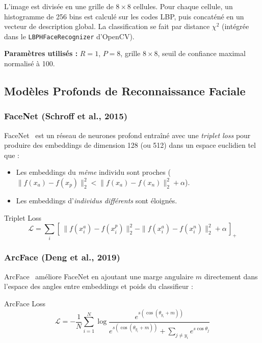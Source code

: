 \documentclass[12pt,a4paper]{article}
\begin{document}
L'image est divisée en une grille de $8 \times 8$ cellules. Pour chaque cellule,
un histogramme de 256 bins est calculé sur les codes LBP, puis concaténé en un
vecteur de description global. La classification se fait par distance $\chi^2$
(intégrée dans le \texttt{LBPHFaceRecognizer} d'OpenCV).

\textbf{Paramètres utilisés :} $R=1$, $P=8$, grille $8\times 8$, seuil de
confiance maximal normalisé à 100.

\subsection{Modèles Profonds de Reconnaissance Faciale}

\subsubsection{FaceNet (Schroff et al., 2015)}

FaceNet~\cite{schroff2015} est un réseau de neurones profond entraîné avec une
\textit{triplet loss} pour produire des embeddings de dimension 128 (ou 512)
dans un espace euclidien tel que :
\begin{itemize}
  \item Les embeddings du \textit{même} individu sont proches ($\|f(x_a) -
        f(x_p)\|_2^2 < \|f(x_a) - f(x_n)\|_2^2 + \alpha$).
  \item Les embeddings d'\textit{individus différents} sont éloignés.
\end{itemize}

\begin{formulebox}{Triplet Loss}
\[
  \mathcal{L} = \sum_i \left[\, \|f(x_i^a) - f(x_i^p)\|_2^2 -
                \|f(x_i^a) - f(x_i^n)\|_2^2 + \alpha \,\right]_+
\]
\end{formulebox}

\subsubsection{ArcFace (Deng et al., 2019)}

ArcFace~\cite{deng2019} améliore FaceNet en ajoutant une marge angulaire $m$
directement dans l'espace des angles entre embeddings et poids du classifieur :

\begin{formulebox}{ArcFace Loss}
\[
  \mathcal{L} = -\frac{1}{N}\sum_{i=1}^{N} \log
  \frac{e^{s(\cos(\theta_{y_i} + m))}}
       {e^{s(\cos(\theta_{y_i} + m))} + \sum_{j \neq y_i} e^{s \cos\theta_j}}
\]
\end{formulebox}
\end{document}
